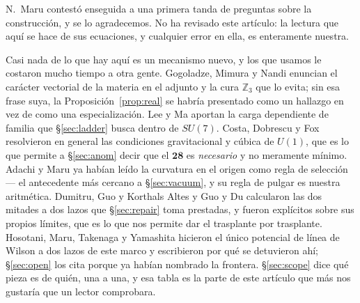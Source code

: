 \documentclass[11pt,a4paper]{article}
\newcommand{\ZZ}{\mathbb{Z}}
\newcommand{\su}[1]{SU(#1)}
\newcommand{\rep}[1]{\mathbf{#1}}
\begin{document}
N.~Maru contestó enseguida a una primera tanda de preguntas sobre la construcción, y se lo
agradecemos. No ha revisado este artículo: la lectura que aquí se hace de sus ecuaciones, y cualquier
error en ella, es enteramente nuestra.

Casi nada de lo que hay aquí es un mecanismo nuevo, y los que usamos le costaron mucho tiempo a otra
gente. Gogoladze, Mimura y Nandi \cite{GMN} enuncian el carácter vectorial de la materia en el adjunto
y la cura $\ZZ_3$ que lo evita; sin esa frase suya, la Proposición~\ref{prop:real} se habría
presentado como un hallazgo en vez de como una especialización. Lee y Ma \cite{FamilyU1} aportan la
carga dependiente de familia que \S\ref{sec:ladder} busca dentro de $\su7$. Costa, Dobrescu y Fox
\cite{CDF} resolvieron en general las condiciones gravitacional y cúbica de $U(1)$, que es lo que
permite a \S\ref{sec:anom} decir que el $\rep{28}$ es \emph{necesario} y no meramente mínimo. Adachi y
Maru \cite{AdachiMaru} ya habían leído la curvatura en el origen como regla de selección --- el
antecedente más cercano a \S\ref{sec:vacuum}, y su regla de pulgar es nuestra aritmética. Dumitru, Guo
y Korthals Altes \cite{DGKA} y Guo y Du \cite{GuoDu} calcularon las dos mitades a dos lazos que
\S\ref{sec:repair} toma prestadas, y fueron explícitos sobre sus propios límites, que es lo que nos
permite dar el trasplante por trasplante. Hosotani, Maru, Takenaga y Yamashita \cite{HMTY} hicieron el
único potencial de línea de Wilson a dos lazos de este marco y escribieron por qué se detuvieron ahí;
\S\ref{sec:open} los cita porque ya habían nombrado la frontera. \S\ref{sec:scope} dice qué pieza es
de quién, una a una, y esa tabla es la parte de este artículo que más nos gustaría que un lector
comprobara.
\end{document}
